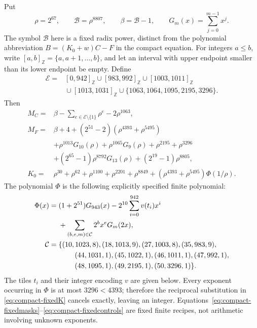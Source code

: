 Put
\[
 \rho=2^{67},\qquad
 \mathcal B=\rho^{8807},\qquad
 \beta=\mathcal B-1,\qquad
 G_m(x)=\sum_{j=0}^{m-1}x^j.
\]
The symbol \(\mathcal B\) here is a fixed radix power, distinct from the
polynomial abbreviation \(B=(K_0+w)C-F\) in the compact equation.
For integers \(a\le b\), write
\([a,b]_{\mathbb Z}=\{a,a+1,\ldots,b\}\), and let an interval with
upper endpoint smaller than its lower endpoint be empty.  Define
\begin{align*}
 \mathcal E={}&[0,942]_{\mathbb Z}
   \cup[983,992]_{\mathbb Z}\cup[1003,1011]_{\mathbb Z}\\
 &{}\cup[1013,1031]_{\mathbb Z}
   \cup\{1063,1064,1095,2195,3296\}.
\end{align*}
Then
\begin{align}
 M_C={}&\beta-\sum_{e\in\mathcal E\setminus\{1\}}\rho^e
                    -2\rho^{1063},\nonumber\\
 M_F={}&\beta+4+(2^{51}-2)(\rho^{4393}+\rho^{5495})\nonumber\\
 &+\rho^{1013}G_{10}(\rho)+\rho^{1065}G_9(\rho)
          +\rho^{2195}+\rho^{3296}\nonumber\\
 &+(2^{65}-1)\rho^{8792}G_{13}(\rho)
          +(2^{19}-1)\rho^{8805},                 \label{eq:compact-fixedmasks}\\
 K_0={}&\rho^{30}+\rho^{62}+\rho^{1100}
       +\rho^{2201}+\rho^{8849}
       +(\rho^{4393}+\rho^{5495})\Phi(1/\rho).
                                                     \label{eq:compact-fixedK}
\end{align}
The polynomial \(\Phi\) is the following explicitly specified finite
polynomial:
\begin{align}
 \Phi(x)={}&(1+2^{51})G_{943}(x)
       -2^{10}\sum_{i=0}^{942}v(t_i)x^i\nonumber\\
 &+\sum_{(b,e,m)\in\mathcal C}2^b x^eG_m(2x),
                                                     \label{eq:compact-fixedPhi}\\
 \mathcal C={}&\{
   (10,1023,8),(18,1013,9),(27,1003,8),(35,983,9),\nonumber\\
 &\hspace{8mm}(44,1031,1),(45,1022,1),(46,1011,1),(47,992,1),\nonumber\\
 &\hspace{8mm}(48,1095,1),(49,2195,1),(50,3296,1)\}.
                                                     \label{eq:compact-fixedcontrols}
\end{align}
The tiles \(t_i\) and their integer encoding \(v\) are given below.
Every exponent occurring in \(\Phi\) is at most \(3296<4393\);
therefore the reciprocal substitution in
\eqref{eq:compact-fixedK} cancels exactly, leaving an integer.
Equations~\eqref{eq:compact-fixedmasks}--\eqref{eq:compact-fixedcontrols}
are fixed finite recipes, not arithmetic involving unknown exponents.

